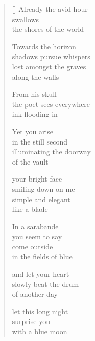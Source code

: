 \documentclass[12pt,a4paper]{article}
\begin{document}

\newpage

\poemtitle{}

\settowidth{\versewidth}{Yet you arise in the still second}

\bigskip

\begin{verse}[\versewidth]
  Already the avid hour \\
  swallows \\
  the shores of the world

  Towards the horizon \\
  shadows pursue whispers \\
  lost amongst the graves \\
  along the walls

  From his skull \\
  the poet sees everywhere \\
  ink flooding in

  Yet you arise \\
  in the still second \\
  illuminating the doorway \\
  of the vault

  your bright face \\
  smiling down on me \\
  simple and elegant \\
  like a blade

  In a sarabande \\
  you seem to say \\
  come outside \\
  in the fields of blue

  and let your heart \\
  slowly beat the drum \\
  of another day

  let this long night \\
  surprise you \\
  with a blue moon
\end{verse}


\newpage

\poemtitle{}

\settowidth{\versewidth}{my lips still reach for the heavens}

\bigskip
\end{document}
